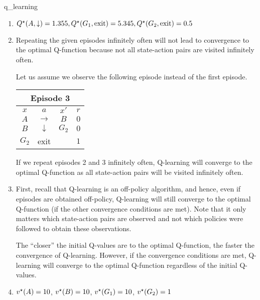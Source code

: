 \begin{solution}{q_learning}
  \begin{enumerate}[beginpenalty=10000]
    \item $\Q*{A}{\downarrow} = 1.355, \Q*{G_1}{\text{exit}} = 5.345, \Q*{G_2}{\text{exit}} = 0.5$

    \item Repeating the given episodes infinitely often will not lead to convergence to the optimal Q-function because not all state-action pairs are visited infinitely often.

    Let us assume we observe the following episode instead of the first episode.
    \begin{center}
      \begin{tabular}{|cccc|}
        \multicolumn{4}{c}{Episode 3} \\
        \hline
        $x$ & $a$ & $x'$ & $r$ \\
        \hline
        $A$ & $\rightarrow$ & $B$ & $0$ \\
        $B$ & $\downarrow$ & $G_2$ & $0$ \\
        $G_2$ & exit & & $1$ \\
        \hline
      \end{tabular}
      \vspace{5pt}
    \end{center}
    If we repeat episodes 2 and 3 infinitely often, Q-learning will converge to the optimal Q-function as all state-action pairs will be visited infinitely often.

    \item First, recall that Q-learning is an off-policy algorithm, and hence, even if episodes are obtained off-policy, Q-learning will still converge to the optimal Q-function (if the other convergence conditions are met).
    Note that it only matters which state-action pairs are observed and not which policies were followed to obtain these observations.

    The ``closer'' the initial Q-values are to the optimal Q-function, the faster the convergence of Q-learning.
    However, if the convergence conditions are met, Q-learning will converge to the optimal Q-function regardless of the initial Q-values.

    \item $\v*{A} = 10$, $\v*{B} = 10$, $\v*{G_1} = 10$, $\v*{G_2} = 1$
  \end{enumerate}
\end{solution}

